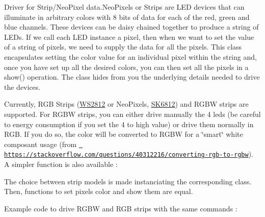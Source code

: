 Driver for Strip/\+Neo\+Pixel data.\+Neo\+Pixels or Strips are L\+ED devices that can illuminate in arbitrary colors with 8 bits of data for each of the red, green and blue channels. These devices can be daisy chained together to produce a string of L\+E\+Ds. If we call each L\+ED instance a pixel, then when we want to set the value of a string of pixels, we need to supply the data for all the pixels. This class encapsulates setting the color value for an individual pixel within the string and, once you have set up all the desired colors, you can then set all the pixels in a show() operation. The class hides from you the underlying details needed to drive the devices.

Currently, R\+GB Strips (\mbox{\hyperlink{classWS2812}{W\+S2812}} or Neo\+Pixels, \mbox{\hyperlink{classSK6812}{S\+K6812}}) and R\+G\+BW strips are supported. For R\+G\+BW strips, you can either drive manually the 4 leds (be careful to energy consumption if you set the 4 to high value) or drive them normally in R\+GB. If you do so, the color will be converted to R\+G\+BW for a \char`\"{}smart\char`\"{} white composant usage (from \href{https://stackoverflow.com/questions/40312216/converting-rgb-to-rgbw}{\texttt{ https\+://stackoverflow.\+com/questions/40312216/converting-\/rgb-\/to-\/rgbw}}). A simpler function is also available \+: 
\begin{DoxyCode}{0}
\end{DoxyCode}


The choice between strip models is made instanciating the corresponding class. Then, functions to set pixels color and show them are equal.

Example code to drive R\+G\+BW and R\+GB strips with the same commands \+:


